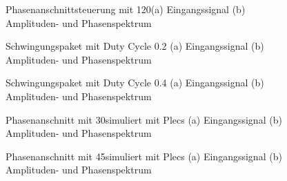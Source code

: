 \begin{appendix}
\begin{figure}[ht!]
	\centering
	\qquad
	\caption{Phasenanschnittsteuerung mit 120\textdegree (a) Eingangssignal (b) Amplituden- und Phasenspektrum}
	\label{fig:Phasenanschnittsteuerung_mit_120}
\end{figure}

\newpage

\begin{figure}[ht!]
	\centering
	\qquad
	\caption{Schwingungspaket mit Duty Cycle 0.2 (a) Eingangssignal (b) Amplituden- und Phasenspektrum}
	\label{fig:Schwingungspaketsteuerung_mit_duty_cycle_0_2}
\end{figure}


\begin{figure}[ht!]
	\centering
	\qquad
	\caption{Schwingungspaket mit Duty Cycle 0.4 (a) Eingangssignal (b) Amplituden- und Phasenspektrum}
	\label{fig:Schwingungspaketsteuerung_mit_duty_cycle_0_4}
\end{figure}

\begin{figure}[ht!]
	\centering
	\qquad
	\caption{Phasenanschnitt mit 30\textdegree simuliert mit Plecs (a) Eingangssignal (b) Amplituden- und Phasenspektrum}
	\label{fig:Plecs_mit_phasenanschnitt_30}
\end{figure}

\newpage

\begin{figure}[ht!]
	\centering
	\qquad
	\caption{Phasenanschnitt mit 45\textdegree simuliert mit Plecs (a) Eingangssignal (b) Amplituden- und Phasenspektrum}
	\label{fig:Plecs_mit_phasenanschnitt_45}
\end{figure}



\end{appendix}

